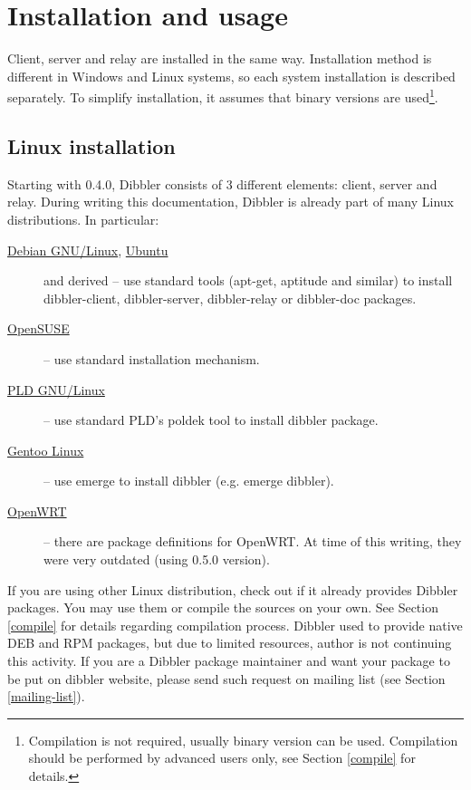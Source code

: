 
\newpage
\section{Installation and usage}
\label{install}
Client, server and relay are installed in the same way. Installation
method is different in Windows and Linux systems, so each system
installation is described separately. To simplify installation, it
assumes that binary versions are used\footnote{Compilation is not
required, usually binary version can be used. Compilation should be
performed by advanced users only, see Section \ref{compile} for
details.}.

\subsection{Linux installation}
Starting with 0.4.0, Dibbler consists of 3 different elements: client,
server and relay. During writing this documentation, Dibbler is already
part of many Linux distributions. In particular:
\begin{description}
 \item[\href{http://debian.org}{Debian
 GNU/Linux}, \href{http://ubuntu.com}{Ubuntu}] and derived -- use
 standard tools (apt-get, aptitude and similar) to install
 dibbler-client, dibbler-server, dibbler-relay or dibbler-doc packages.
\item[\href{http://opensuse.org}{OpenSUSE}] -- use standard
 installation mechanism.
\item[\href{http://www.pld-linux.org}{PLD GNU/Linux}]
 -- use standard PLD's poldek tool to install dibbler
 package.  \item[\href{http://www.gentoo.org}{Gentoo Linux}] -- use
 emerge to install dibbler (e.g. emerge dibbler).
\item[\href{http://openwrt.org}{OpenWRT}] -- there are package
 definitions for OpenWRT. At time of this writing, they were very
 outdated (using 0.5.0 version).
\end{description}

If you are using other Linux distribution, check out if it already
provides Dibbler packages. You may use them or compile the sources on
your own. See Section \ref{compile} for details regarding compilation
process. Dibbler used to provide native DEB and RPM packages, but due
to limited resources, author is not continuing this activity. If you
are a Dibbler package maintainer and want your package to be put on
dibbler website, please send such request on mailing list (see
Section \ref{mailing-list}).

